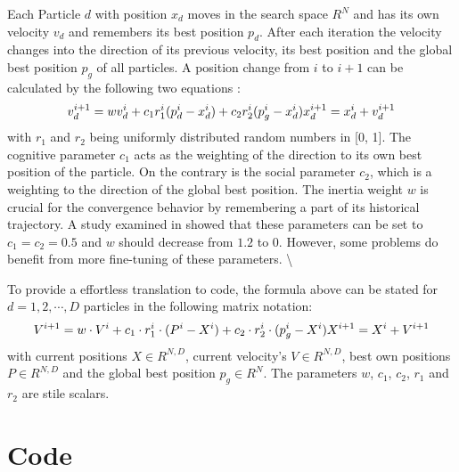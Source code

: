 \documentclass[
  oneside]{book}
\begin{document}
Each Particle \(d\) with position \(x_d\) moves in the search space \(R^N\) and has its own velocity \(v_d\) and remembers its best position \(p_d\). After each iteration the velocity changes into the direction of its previous velocity, its best position and the global best position \(p_g\) of all particles. A position change from \(i\) to \(i+1\) can be calculated by the following two equations \citep{PaVr2002}:
\[
  v_d^{i+1} = wv_d^{i} + c_1 r_1^i (p_d^i-x_d^i) + c_2 r_2^i (p_g^i - x_d^i) \\
  x_d^{i+1} = x_d^i + v_d^{i+1}
\]
with \(r_1\) and \(r_2\) being uniformly distributed random numbers in {[}0, 1{]}. The cognitive parameter \(c_1\) acts as the weighting of the direction to its own best position of the particle. On the contrary is the social parameter \(c_2\), which is a weighting to the direction of the global best position. The inertia weight \(w\) is crucial for the convergence behavior by remembering a part of its historical trajectory. A study examined in \citep{PaVr2002} showed that these parameters can be set to \(c_1=c_2=0.5\) and \(w\) should decrease from \(1.2\) to \(0\). However, some problems do benefit from more fine-tuning of these parameters. \textbackslash{}

To provide a effortless translation to code, the formula above can be stated for \(d = 1, 2, \cdots, D\) particles in the following matrix notation:
\[
  V^{i+1} = w \cdot V^{i} + c_1 \cdot r_1^i \cdot (P^i-X^i) + c_2 \cdot r_2^i \cdot (p_g^i - X^i) \\
  X^{i+1} = X^i + V^{i+1}
\]
with current positions \(X \in R^{N,D}\), current velocity's \(V \in R^{N,D}\), best own positions \(P \in R^{N,D}\) and the global best position \(p_g \in R^{N}\). The parameters \(w\), \(c_1\), \(c_2\), \(r_1\) and \(r_2\) are stile scalars.

\hypertarget{code}{%
\section{Code}\label{code}}
\end{document}

